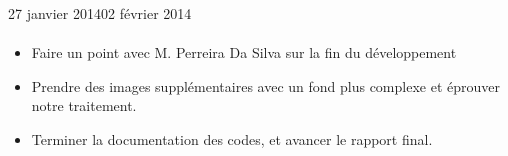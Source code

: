 \documentclass[11pt, french]{report-rd-info}
\begin{document}
\begin{fichesuivi}{27 janvier 2014}{02 février 2014}
\paragraph*{}
	\begin{planification}
		\begin{itemize}
			\item Faire un point avec M. Perreira Da Silva sur la fin du développement
			\item Prendre des images supplémentaires avec un fond plus complexe et éprouver notre traitement.
			\item Terminer la documentation des codes, et avancer le rapport final.
\end{itemize}
	\end{planification}
\end{fichesuivi}
\end{document}
